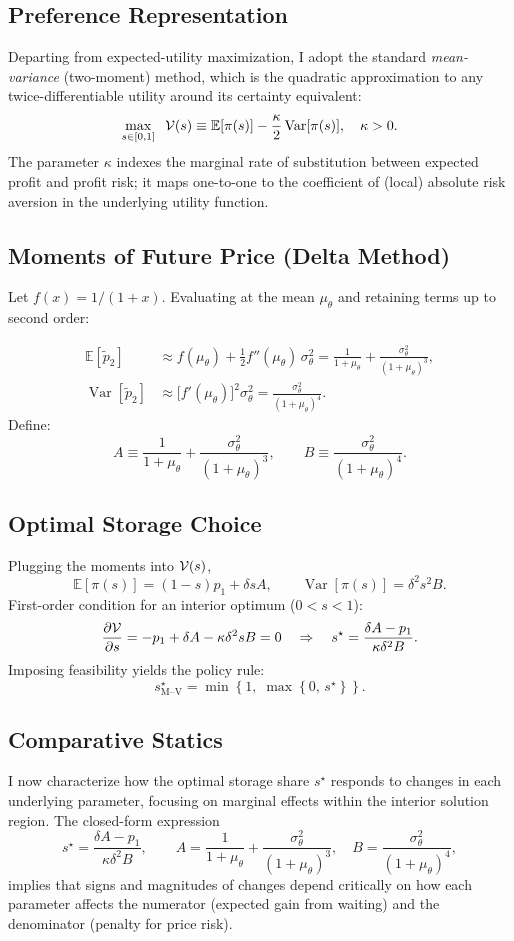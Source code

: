 \subsection{Preference Representation}
\noindent
Departing from expected-utility maximization, I adopt the standard \textit{mean-variance} (two-moment) method, which is the quadratic approximation to any twice-differentiable utility around its certainty equivalent:
$$
\max_{s\in[0,1]}
\;\;{\cal V}(s)
\equiv
\mathbb E[\pi(s)]
-\frac{\kappa}{2}\operatorname{Var}[\pi(s)],
\quad\kappa>0.
$$
The parameter \(\kappa\) indexes the marginal rate of substitution between expected profit and profit risk; it maps one-to-one to the coefficient of (local) absolute risk aversion in the underlying utility function.

\subsection{Moments of Future Price (Delta Method)}
\noindent
Let $f(x)=1/(1+x)$. Evaluating at the mean $\mu_\theta$ and retaining terms up to second order:

$$
\begin{aligned}
\mathbb E[\tilde p_{2}]
&\approx f(\mu_\theta)+\tfrac12 f''(\mu_\theta)\,\sigma_\theta^{2}
= \frac{1}{1+\mu_\theta}
  +\frac{\sigma_\theta^{2}}{(1+\mu_\theta)^{3}},\\[6pt]
\operatorname{Var}[\tilde p_{2}]
&\approx\bigl[f'(\mu_\theta)\bigr]^{2}\sigma_\theta^{2}
= \frac{\sigma_\theta^{2}}{(1+\mu_\theta)^{4}}.
\end{aligned}
$$
Define:
$$
A \equiv \frac{1}{1+\mu_\theta} + \frac{\sigma_\theta^2}{(1+\mu_\theta)^3},\qquad
B \equiv \frac{\sigma_\theta^2}{(1+\mu_\theta)^4}.
$$

\subsection{Optimal Storage Choice}
\noindent
Plugging the moments into \({\cal V}(s)\),
$$
\mathbb E[\pi(s)]       =(1-s)p_{1}+\delta sA,
\qquad
\operatorname{Var}[\pi(s)]=\delta^{2}s^{2}B.
$$
First-order condition for an interior optimum (\(0<s<1\)):
$$
\frac{\partial{\cal V}}{\partial s}
= -p_{1}+\delta A - \kappa\delta^{2}sB = 0
\quad\Rightarrow\quad
s^{\star} = \frac{\delta A - p_1}{\kappa \delta^2 B}.
$$
Imposing feasibility yields the policy rule:
$$
s^{\star}_\text{M--V} = \min\left\{1,\;\max\left\{0,\,s^{\star}\right\}\right\}.
$$

\subsection{Comparative Statics}
\noindent
I now characterize how the optimal storage share \(s^{\star}\) responds to changes in each underlying parameter, focusing on marginal effects within the interior solution region. The closed-form expression
$$
s^{\star} = \frac{\delta A - p_1}{\kappa \delta^2 B},
\qquad
A = \frac{1}{1 + \mu_\theta} + \frac{\sigma_\theta^2}{(1 + \mu_\theta)^3},
\quad
B = \frac{\sigma_\theta^2}{(1 + \mu_\theta)^4},
$$
implies that signs and magnitudes of changes depend critically on how each parameter affects the numerator (expected gain from waiting) and the denominator (penalty for price risk).

